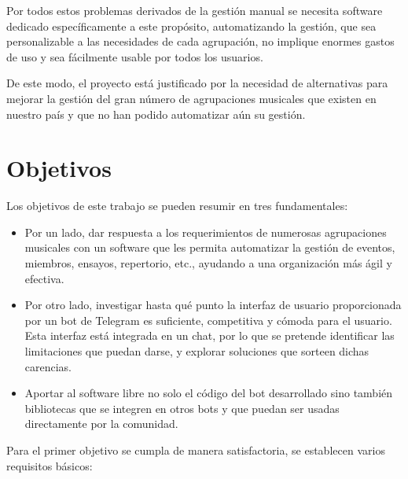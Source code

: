 Por todos estos problemas derivados de la gestión manual se necesita software dedicado específicamente a este propósito, automatizando la gestión, que sea personalizable a las necesidades de cada agrupación, no implique enormes gastos de uso y sea fácilmente usable por todos los usuarios.

De este modo, el proyecto está justificado por la necesidad de alternativas para mejorar la gestión del gran número de agrupaciones musicales que existen en nuestro país y que no han podido automatizar aún su gestión.

\section{Objetivos}


Los objetivos de este trabajo se pueden resumir en tres fundamentales:

\begin{itemize}
    \item Por un lado, dar respuesta a los requerimientos de numerosas agrupaciones musicales con un software que les permita automatizar la gestión de eventos, miembros, ensayos, repertorio, etc., ayudando a una organización más ágil y efectiva.
    \item Por otro lado, investigar hasta qué punto la interfaz de usuario proporcionada por un bot de Telegram es suficiente, competitiva y cómoda para el usuario. Esta interfaz está integrada en un chat, por lo que se pretende identificar las limitaciones que puedan darse, y explorar soluciones que sorteen dichas carencias.
    \item Aportar al software libre no solo el código del bot desarrollado sino también bibliotecas que se integren en otros bots y que puedan ser usadas directamente por la comunidad.
\end{itemize}

Para el primer objetivo se cumpla de manera satisfactoria, se establecen varios requisitos básicos:

